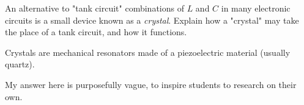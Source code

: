 

An alternative to "tank circuit" combinations of $L$ and $C$ in many electronic circuits is a small device known as a {\it crystal}.  Explain how a "crystal" may take the place of a tank circuit, and how it functions.







Crystals are mechanical resonators made of a piezoelectric material (usually quartz).







My answer here is purposefully vague, to inspire students to research on their own.




